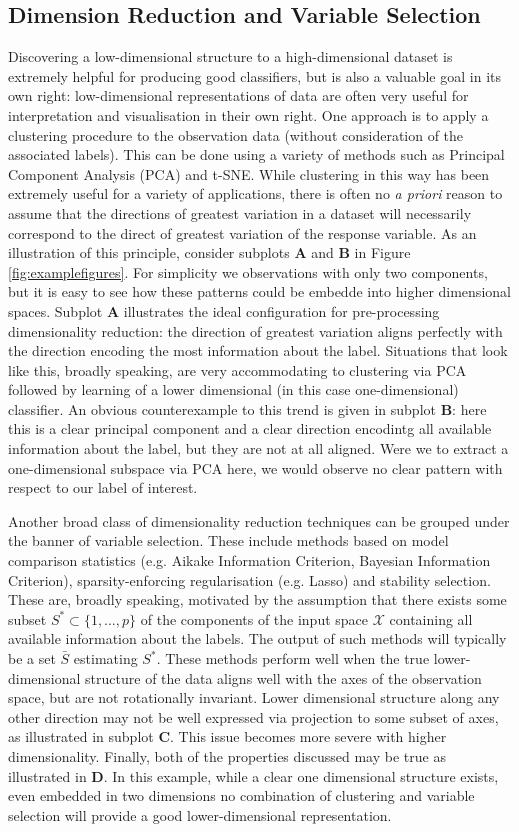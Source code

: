 \documentclass[12pt]{article}
\begin{document}
\subsection{Dimension Reduction and Variable Selection}
Discovering a low-dimensional structure to a high-dimensional dataset is extremely helpful for producing good classifiers, but is also a valuable goal in its own right: low-dimensional representations of data are often very useful for interpretation and visualisation in their own right. One approach is to apply a clustering procedure to the observation data (without consideration of the associated labels). This can be done using a variety of methods such as Principal Component Analysis (PCA) and t-SNE. While clustering in this way has been extremely useful for a variety of applications, there is often no \textit{a priori} reason to assume that the directions of greatest variation in a dataset will necessarily correspond to the direct of greatest variation of the response variable. As an illustration of this principle, consider subplots \textbf{A} and \textbf{B} in Figure \ref{fig:examplefigures}. For simplicity we observations with only two components, but it is easy to see how these patterns could be embedde into higher dimensional spaces. Subplot \textbf{A} illustrates the ideal configuration for pre-processing dimensionality reduction: the direction of greatest variation aligns perfectly with the direction encoding the most information about the label. Situations that look like this, broadly speaking, are very accommodating to clustering via PCA followed by learning of a lower dimensional (in this case one-dimensional) classifier. An obvious counterexample to this trend is given in subplot \textbf{B}: here this is a clear principal component and a clear direction encodintg all available information about the label, but they are not at all aligned. Were we to extract a one-dimensional subspace via PCA here, we would observe no clear pattern with respect to our label of interest. 

Another broad class of dimensionality reduction techniques can be grouped under the banner of variable selection. These include methods based on model comparison statistics (e.g. Aikake Information Criterion, Bayesian Information Criterion), sparsity-enforcing regularisation (e.g. Lasso) and stability selection. These are, broadly speaking, motivated by the assumption that there exists some subset $S^* \subset \{1,\dots,p\}$ of the components of the input space $\mathcal{X}$ containing all available information about the labels. The output of such methods will typically be a set $\bar{S}$ estimating $S^*$. These methods perform well when the true lower-dimensional structure of the data aligns well with the axes of the observation space, but are not rotationally invariant. Lower dimensional structure along any other direction may not be well expressed via projection to some subset of axes, as illustrated in subplot $\textbf{C}$. This issue becomes more severe with higher dimensionality. Finally, both of the properties discussed may be true as illustrated in \textbf{D}. In this example, while a clear one dimensional structure exists, even embedded in two dimensions no combination of clustering and variable selection will provide a good lower-dimensional representation. 
\end{document}
